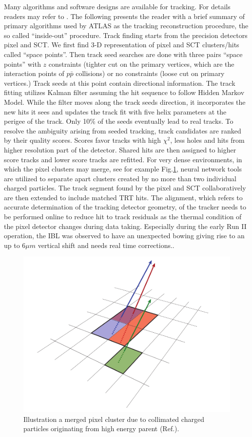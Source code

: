 \label{sec:reco-tracking}
Many algorithms and software designs are available for tracking. For details readers may refer to \cite{Cornelissen:1020106}. The following presents the reader with a brief summary of primary algorithms used by ATLAS as the tracking reconstruction procedure, the so called ``inside-out'' procedure. Track finding starts from the precision detectors pixel and SCT. We first find 3-D representation of pixel and SCT clusters/hits called ``space points''. Then track seed searches are done with three pairs ``space points'' with $z$ constraints (tighter cut on the primary vertices, which are the interaction points of $p\bar p$ collisions) or no constraints (loose cut on primary vertices.) Track seeds at this point contain directional information. The track fitting utilizes Kalman filter assuming the hit sequence to follow Hidden Markov Model. While the filter moves along the track seeds direction, it incorporates the new hits it sees and updates the track fit with five helix parameters at the perigee of the track. Only 10\% of the seeds eventually lead to real tracks. To resolve the ambiguity arising from seeded tracking, track candidates are ranked by their quality scores. Scores favor tracks with high $\chi^2$, less holes and hits from higher resolution part of the detector. Shared hits are then assigned to higher score tracks and lower score tracks are refitted. For very dense environments, in which the pixel clusters may merge, see for example Fig.\ref{fig:reco-trackingcluster}, neural network tools are utilized to separate apart clusters created by no more than two individual charged particles\cite{PERF-2012-05,Aaboud:2017all}. The track segment found by the pixel and SCT collaboratively are then extended to include matched TRT hits. The alignment, which refers to accurate determination of the tracking detector geometry, of the tracker needs to be performed online to reduce hit to track residuals as the thermal condition of the pixel detector changes during data taking. Especially during the early Run II operation, the IBL was observed to have an unexpected bowing giving rise to an up to 6$\mu m$ vertical shift and needs real time corrections.\cite{tracking-align}.

\begin{figure}[htpb!]
\begin{center}
  \includegraphics[width=0.55\linewidth]{figures/Reco/TrackingClusterB}
  \caption{ Illustration a merged pixel cluster due to collimated charged particles originating from high energy parent (Ref.\cite{Aaboud:2017all}). }
\label{fig:reco-trackingcluster}
\end{center}
\end{figure}


